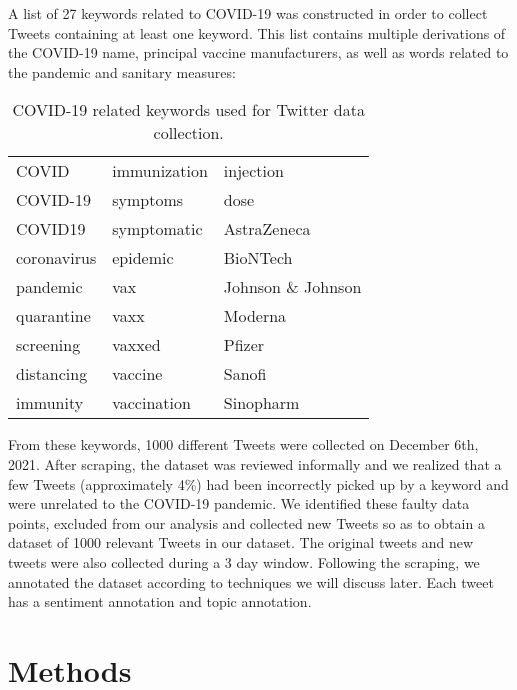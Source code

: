 \documentclass[letterpaper]{article} %
\begin{document}


A list of 27 keywords related to COVID-19 was constructed in order to collect Tweets containing at least one keyword. This list contains multiple derivations of the COVID-19 name, principal vaccine manufacturers, as well as words related to the pandemic and sanitary measures: 

\vspace{0.1cm}

\begin{table}[htb]
\caption{COVID-19 related keywords used for Twitter data collection.}
  \centering
\begin{tabular}{|M{2cm}|M{2cm}|M{2.8cm}| }
 \hline 
 COVID & immunization & injection\\
 COVID-19 & symptoms & dose\\
 COVID19 & symptomatic & AstraZeneca\\
 coronavirus & epidemic & BioNTech\\
 pandemic & vax & Johnson \& Johnson\\
 quarantine & vaxx & Moderna\\
 screening & vaxxed & Pfizer\\
 distancing & vaccine & Sanofi\\
 immunity & vaccination & Sinopharm\\
 \hline
\end{tabular}
\end{table}

\vspace{0.1cm}


From these keywords, 1000 different Tweets were collected on December 6th, 2021. After scraping, the dataset was reviewed informally and we realized that a few Tweets (approximately 4\%) had been incorrectly picked up by a keyword and were unrelated to the COVID-19 pandemic. We identified these faulty data points, excluded from our analysis and collected new Tweets so as to obtain a dataset of 1000 relevant Tweets in our dataset. The original tweets and new tweets were also collected during a 3 day window. Following the scraping, we annotated the dataset according to techniques we will discuss later. Each tweet has a sentiment annotation and topic annotation. 

\section{Methods}
\end{document}
